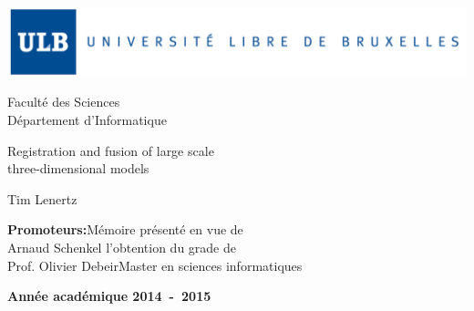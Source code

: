 \frontmatter
\begin{titlepage}
\begin{center}

\sffamily

\includegraphics[width=\textwidth]{fig/ulb.jpg}

\begin{flushright}
Faculté des Sciences \\
Département d'Informatique
\end{flushright}

\vfill{} \vfill{}

{\Huge
Registration and fusion of large scale \\
\vspace{.3cm}
three-dimensional models
}

\vspace*{.8cm}
{\Large Tim Lenertz}


\vfill{} \vfill{}

\begin{flushright}
{\large \textbf{Promoteurs:}}\hfill{}{\large Mémoire présenté en vue de}\\
{\large Arnaud Schenkel}     \hfill{}{\large l'obtention du grade de}\\
{\large Prof. Olivier Debeir}\hfill{}{\large Master en sciences informatiques}\\
\end{flushright}

\vfill{}\vfill{}\enlargethispage{3cm}

\textbf{Année académique 2014~-~2015}
\end{center}

\end{titlepage}
